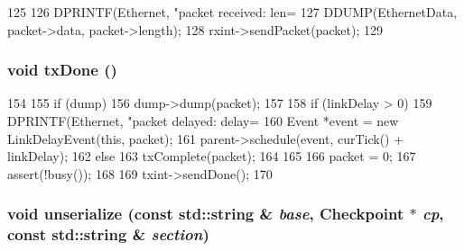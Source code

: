 \begin{DoxyCode}
125 {
126     DPRINTF(Ethernet, "packet received: len=%
127     DDUMP(EthernetData, packet->data, packet->length);
128     rxint->sendPacket(packet);
129 }
\end{DoxyCode}
\hypertarget{classEtherLink_1_1Link_ac06188e141ad966d9d760cfcfc258587}{
\subsubsection[{txDone}]{\setlength{\rightskip}{0pt plus 5cm}void txDone ()}}
\label{classEtherLink_1_1Link_ac06188e141ad966d9d760cfcfc258587}



\begin{DoxyCode}
154 {
155     if (dump)
156         dump->dump(packet);
157 
158     if (linkDelay > 0) {
159         DPRINTF(Ethernet, "packet delayed: delay=%
160         Event *event = new LinkDelayEvent(this, packet);
161         parent->schedule(event, curTick() + linkDelay);
162     } else {
163         txComplete(packet);
164     }
165 
166     packet = 0;
167     assert(!busy());
168 
169     txint->sendDone();
170 }
\end{DoxyCode}
\hypertarget{classEtherLink_1_1Link_a147c320e3d6506edf5587a40cd8e430d}{
\subsubsection[{unserialize}]{\setlength{\rightskip}{0pt plus 5cm}void unserialize (const std::string \& {\em base}, \/  {\bf Checkpoint} $\ast$ {\em cp}, \/  const std::string \& {\em section})}}
\label{classEtherLink_1_1Link_a147c320e3d6506edf5587a40cd8e430d}


